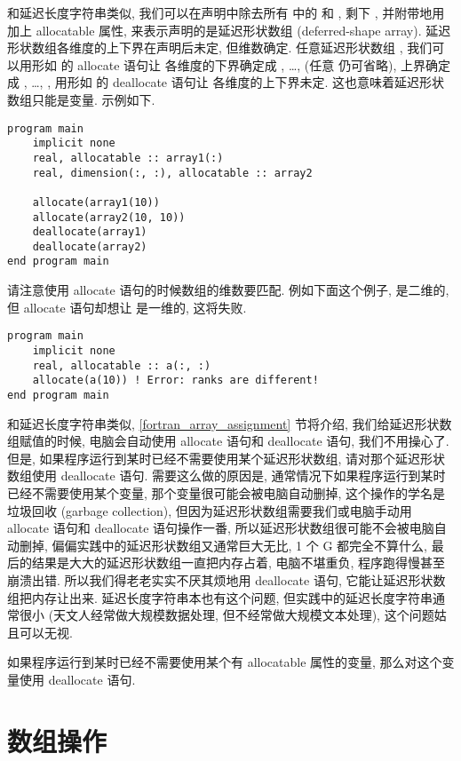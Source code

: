 和延迟长度字符串类似, 我们可以在声明中除去所有  中的  和 , 剩下 \ttt{:}, 并附带地用  加上 allocatable 属性, 来表示声明的是延迟形状数组 (deferred-shape array). 延迟形状数组各维度的上下界在声明后未定, 但维数确定. 任意延迟形状数组 , 我们可以用形如  的 allocate 语句让  各维度的下界确定成 , \dots,  (任意  仍可省略), 上界确定成 , \dots, , 用形如  的 deallocate 语句让  各维度的上下界未定. 这也意味着延迟形状数组只能是变量. 示例如下.
\begin{lstlisting}
program main
    implicit none
    real, allocatable :: array1(:)
    real, dimension(:, :), allocatable :: array2

    allocate(array1(10))
    allocate(array2(10, 10))
    deallocate(array1)
    deallocate(array2)
end program main
\end{lstlisting}
请注意使用 allocate 语句的时候数组的维数要匹配. 例如下面这个例子,  是二维的, 但 allocate 语句却想让  是一维的, 这将失败.
\begin{lstlisting}
program main
    implicit none    
    real, allocatable :: a(:, :)
    allocate(a(10)) ! Error: ranks are different!
end program main
\end{lstlisting}

和延迟长度字符串类似, \ref{fortran_array_assignment} 节将介绍, 我们给延迟形状数组赋值的时候, 电脑会自动使用 allocate 语句和 deallocate 语句, 我们不用操心了. 但是, 如果程序运行到某时已经不需要使用某个延迟形状数组, 请对那个延迟形状数组使用 deallocate 语句. 需要这么做的原因是, 通常情况下如果程序运行到某时已经不需要使用某个变量, 那个变量很可能会被电脑自动删掉, 这个操作的学名是垃圾回收 (garbage collection), 但因为延迟形状数组需要我们或电脑手动用 allocate 语句和 deallocate 语句操作一番, 所以延迟形状数组很可能不会被电脑自动删掉, 偏偏实践中的延迟形状数组又通常巨大无比, 1 个 G 都完全不算什么, 最后的结果是大大的延迟形状数组一直把内存占着, 电脑不堪重负, 程序跑得慢甚至崩溃出错. 所以我们得老老实实不厌其烦地用 deallocate 语句, 它能让延迟形状数组把内存让出来. 延迟长度字符串本也有这个问题, 但实践中的延迟长度字符串通常很小 (天文人经常做大规模数据处理, 但不经常做大规模文本处理), 这个问题姑且可以无视.
\begin{convention}
    如果程序运行到某时已经不需要使用某个有 allocatable 属性的变量, 那么对这个变量使用 deallocate 语句.
\end{convention}

\section{数组操作}\label{fortran_array_manipulation}

